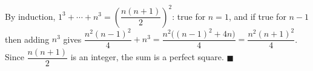 By induction, $1^3+\cdots+n^3=\left(\dfrac{n(n+1)}2\right)^2$: true for $n=1$, and if true for $n-1$ then adding $n^3$ gives $\dfrac{n^2(n-1)^2}4+n^3=\dfrac{n^2\big((n-1)^2+4n\big)}4=\dfrac{n^2(n+1)^2}4$. Since $\dfrac{n(n+1)}2$ is an integer, the sum is a perfect square. $\blacksquare$
